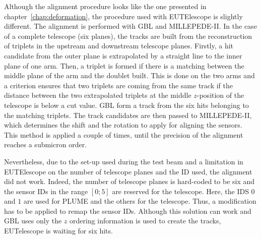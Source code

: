    Although the alignment procedure looks like the one presented in chapter~\ref{chap:deformation}, the procedure used with EUTElescope is slightly different.
    The alignment is performed with \gls{GBL} and MILLEPEDE-II.
    In the case of a complete telescope (six planes), the tracks are built from the reconstruction of triplets in the upstream and downstream telescope planes.
    Firstly, a hit candidate from the outer plane is extrapolated by a straight line to the inner plane of one arm.
    Then, a triplet is formed if there is a matching between the middle plane of the arm and the doublet built.
    This is done on the two arms and a criterion ensures that two triplets are coming from the same track if the distance between the two extrapolated triplets at the middle $z$-position of the telescope is below a cut value.
    \gls{GBL} form a track from the six hits belonging to the matching triplets.
    The track candidates are then passed to MILLEPEDE-II, which determines the shift and the rotation to apply for aligning the sensors.
    This method is applied a couple of times, until the precision of the alignment reaches a submicron order.

    Nevertheless, due to the set-up used during the test beam and a limitation in EUTElescope on the number of telescope planes and the ID used, the alignment did not work.
    Indeed, the number of telescope planes is hard-coded to be six and the sensor IDs in the range $[0; 5]$ are reserved for the telescope. 
    Here, the IDS $0$ and $1$ are used for \gls{PLUME} and the others for the telescope.
    Thus, a modification has to be applied to remap the sensor IDs. 
    Although this solution can work and \gls{GBL} uses only the $z$ ordering information is used to create the tracks, EUTelescope is waiting for six hits.




